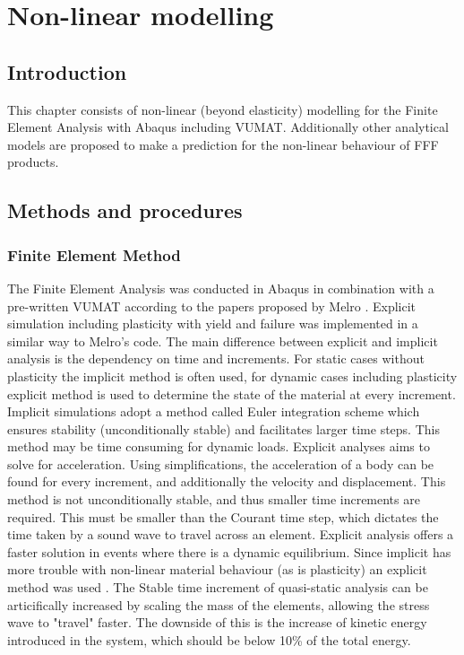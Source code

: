 \chapter{Non-linear modelling}
\label{chp:5}

\section{Introduction}
This chapter consists of  non-linear (beyond elasticity) modelling for the Finite Element Analysis with Abaqus including VUMAT. Additionally other analytical models are proposed to make a prediction for the non-linear behaviour of FFF products. 

\section{Methods and procedures}
\subsection{Finite Element Method}
The Finite Element Analysis was conducted in Abaqus in combination with a pre-written VUMAT according to the papers proposed by Melro \cite{Melro2012InfluenceMaterials}\cite{Melro2013}\cite{Melro2013MicromechanicalModelling}. 
Explicit simulation including plasticity with yield and failure was implemented in a similar way to Melro's code. The main difference between explicit and implicit analysis is the dependency on time and increments. For static cases without plasticity the implicit method is often used, for dynamic cases including plasticity explicit method is used to determine the state of the material at every increment. Implicit simulations adopt a method called Euler integration scheme which ensures stability (unconditionally stable) and facilitates larger time steps. This method may be time consuming for dynamic loads.  Explicit analyses aims to solve for acceleration. Using simplifications, the acceleration of a body can be found for every increment, and additionally the velocity and displacement. This method is not unconditionally stable, and thus smaller time increments are required. This must be smaller than the Courant time step, which dictates the time taken by a sound wave to travel across an element. Explicit analysis offers a faster solution in events where there is a dynamic equilibrium. Since implicit has more trouble with non-linear material behaviour (as is plasticity) an explicit method was used \cite{Harish2019ImplicitMethod}. The Stable time increment of quasi-static analysis can be articifically increased by scaling the mass of the elements, allowing the stress wave to "travel" faster. The downside of this is the increase of kinetic energy introduced in the system, which should be below 10\% of the total energy.  

